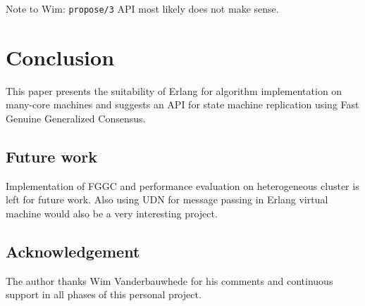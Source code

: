 \documentclass[english,11pt]{l4proj}
\newcommand{\fggc}{Fast Genuine Generalized Consensus}
\begin{document}
Note to Wim: {\tt propose/3} API most likely does not make sense.

\section{Conclusion}
\label{sec:conclusion}

This paper presents the suitability of Erlang for algorithm implementation on
many-core machines and suggests an API for state machine replication using
\fggc.

\subsection{Future work}
\label{sec:future-work}

Implementation of FGGC and performance evaluation on heterogeneous cluster is
left for future work. Also using UDN for message passing in Erlang virtual
machine would also be a very interesting project.

\subsection{Acknowledgement}

The author thanks Wim Vanderbauwhede for his comments and continuous support in
all phases of this personal project.
\end{document}
